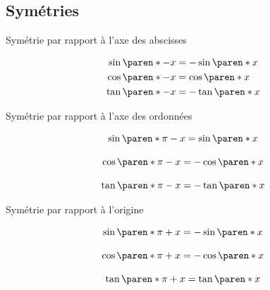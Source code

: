 \documentclass[french,xcolor=svgnames]{beamer}
\begin{document}
\subsection{Symétries}
\begin{frame}{Symétrie par rapport à l'axe des abscisses}
\begin{minipage}{0.5\linewidth}
\centering
\scalebox{0.75}{}
\end{minipage}
\begin{minipage}{0.45\linewidth}
\centering

\begin{align*}
\sin\paren*{ -x}&=-\sin\paren*{ x} \\
\cos\paren*{ -x}&=\cos\paren*{ x} \\ 
\tan\paren*{ -x}&=-\tan\paren*{ x}
\end{align*}
\end{minipage}
\end{frame}
\begin{frame}{Symétrie par rapport à l'axe des ordonnées}
\begin{minipage}{0.5\linewidth}
\centering
\scalebox{0.75}{}
\end{minipage}
\begin{minipage}{0.45\linewidth}
\centering
\[\begin{array}{c}
\sin\paren*{ \pi -x} =\sin\paren*{ x} \\
\\
\cos\paren*{ \pi -x} =-\cos\paren*{ x} \\
\\
\tan\paren*{ \pi -x} =-\tan\paren*{ x}
\end{array}\]
\end{minipage}
\end{frame}
\begin{frame}{Symétrie par rapport à l'origine}
\begin{minipage}{0.5\linewidth}
\centering
\scalebox{0.75}{}
\end{minipage}
\begin{minipage}{0.45\linewidth}
\centering
\[\begin{array}{c}
\sin\paren*{ \pi +x} =-\sin\paren*{ x} \\ \\
\cos\paren*{ \pi +x} =-\cos\paren*{ x} \\ \\
\tan\paren*{ \pi +x} =\tan\paren*{ x}
\end{array}\]
\end{minipage}
\end{frame}
\end{document}
